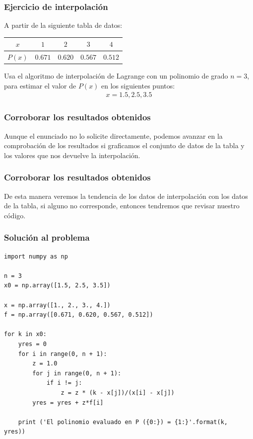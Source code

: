 \documentclass[12pt]{beamer}
\begin{document}
\begin{frame}
\frametitle{Ejercicio de interpolación}
A partir de la siguiente tabla de datos:
\pause
\begin{center}
\renewcommand{\arraystretch}{0.9}
\begin{tabular}{c | c | c | c | c}
$x$ & $1$ & $2$ & $3$ & $4$ \\ \hline
$P (x)$ & $0.671$ & $0.620$ & $0.567$ & $0.512$ \\
\end{tabular}
\end{center}
\pause
Usa el algoritmo de interpolación de Lagrange con un polinomio de grado $n = 3$, para estimar el valor de $P (x)$ en los siguientes puntos:
\\
\medskip
\begin{align*}
x = 1.5, 2.5, 3.5
\end{align*}
\end{frame}
\begin{frame}
\frametitle{Corroborar los resultados obtenidos}
Aunque el enunciado no lo solicite directamente, podemos avanzar en la comprobación de los resultados si graficamos el conjunto de datos de la tabla y los valores que nos devuelve la interpolación.
\end{frame}
\begin{frame}
\frametitle{Corroborar los resultados obtenidos}
De esta manera veremos la tendencia de los datos de interpolación con los datos de la tabla, si alguno no corresponde, entonces tendremos que revisar nuestro código.
\end{frame}
\begin{frame}
\frametitle{Solución al problema}
\begin{lstlisting}[caption=Código para la interpolación de Lagrange, basicstyle=\linespread{0.9}\ttfamily\small, columns=fullflexible]
import numpy as np

n = 3
x0 = np.array([1.5, 2.5, 3.5])

x = np.array([1., 2., 3., 4.])
f = np.array([0.671, 0.620, 0.567, 0.512])

for k in x0:
    yres = 0
    for i in range(0, n + 1):
        z = 1.0
        for j in range(0, n + 1):
            if i != j:
                z = z * (k - x[j])/(x[i] - x[j])
        yres = yres + z*f[i]
    
    print ('El polinomio evaluado en P ({0:}) = {1:}'.format(k,  yres))
\end{lstlisting}
\end{frame}
\end{document}
